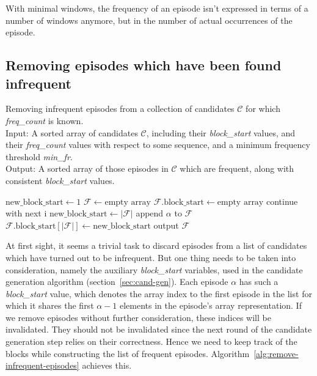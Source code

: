 With minimal windows, the frequency of an episode isn't expressed in terms of a number of windows anymore, but in the number of actual occurrences of the episode.

\subsection{Removing episodes which have been found infrequent}
\label{sec:maintain-blocks}

\begin{algorithm}

\caption{Removing infrequent episodes from a collection of candidates $ \mathcal{C} $ for which \emph{freq\_count} is known. \\
Input: A sorted array of candidates $ \mathcal{C} $, including their \emph{block\_start} values, and their \emph{freq\_count} values with respect to some sequence, and a minimum frequency threshold \emph{min\_fr}. \\
Output: A sorted array of those episodes in $ \mathcal{C} $ which are frequent, along with consistent \emph{block\_start} values.
}

\begin{algorithmic}[1]

\State $ \text{new\_block\_start} \gets 1 $
\State $ \mathcal{F} \gets \text{empty array} $
\State $ \mathcal{F} \text{.block\_start} \gets \text{empty array} $
        \State continue with next i
    \EndIf
     \label{alglin:remove-infrequent-episodes:different-block-test}
        \State $ \text{new\_block\_start} \gets | \mathcal{F} | $
    \EndIf
    \State append $ \alpha $ to $ \mathcal{F} $
    \State $ \mathcal{F} \text{.block\_start}[ | \mathcal{F} | ] \gets \text{new\_block\_start} $
\EndFor
\State output $ \mathcal{F} $

\end{algorithmic}

\label{alg:remove-infrequent-episodes}
\end{algorithm}

At first sight, it seems a trivial task to discard episodes from a list of candidates which have turned out to be infrequent. But one thing needs to be taken into consideration, namely the auxiliary \emph{block\_start} variables, used in the candidate generation algorithm (section~\ref{sec:cand-gen}). Each episode $ \alpha $ has such a \emph{block\_start} value, which denotes the array index to the first episode in the list for which it shares the first $ \alpha - 1 $ elements in the episode's array representation. If we remove episodes without further consideration, these indices will be invalidated. They should not be invalidated since the next round of the candidate generation step relies on their correctness. Hence we need to keep track of the blocks while constructing the list of frequent episodes. Algorithm~\ref{alg:remove-infrequent-episodes} achieves this.

